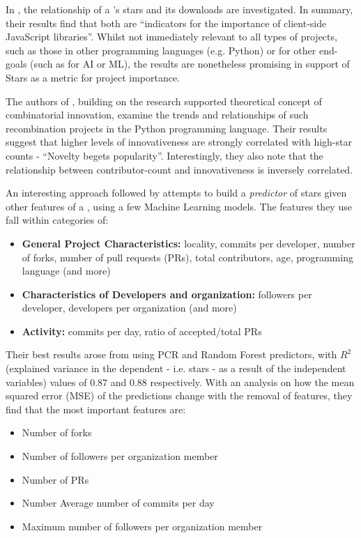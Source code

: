 In \cite{koch_2024_FaultOur}, the relationship of a \repo{}'s stars and its downloads are investigated. In summary, their results find that both are ``indicators for the importance of client-side JavaScript libraries''. Whilst not immediately relevant to all types of \gh{} projects, such as those in other programming languages (e.g. Python) or for other end-goals (such as for AI or ML), the results are nonetheless promising in support of Stars as a metric for project importance.

The authors of \cite{fang2024innovation}, building on the research supported theoretical concept of combinatorial innovation, examine the trends and relationships of such recombination projects in the Python programming language.
Their results suggest that higher levels of innovativeness are strongly correlated with high-star counts - ``Novelty begets popularity''. Interestingly, they also note that the relationship between contributor-count and innovativeness is inversely correlated.

An interesting approach followed by \cite{9588891} attempts to build a \emph{predictor} of \repo{} stars given other features of a \repo{}, using a few Machine Learning models.
The features they use fall within categories of:
\begin{itemize}
  \item \textbf{General Project Characteristics:} locality, commits per developer, number of forks, number of pull requests (PRs), total contributors, \repo{} age, programming language (and more)
  \item \textbf{Characteristics of Developers and organization:} followers per developer, developers per organization (and more)
  \item \textbf{Activity:} commits per day, ratio of accepted/total PRs
\end{itemize}

Their best results arose from using PCR and Random Forest predictors, with $R^2$ (explained variance in the dependent - i.e. stars - as a result of the independent variables) values of $0.87$ and $0.88$ respectively.
With an analysis on how the mean squared error (MSE) of the predictions change with the removal of features, they find that the most important features are:
\begin{itemize}
  \item Number of forks
  \item Number of followers per organization member
  \item Number of PRs
  \item Number Average number of commits per day
  \item Maximum number of followers per organization member
\end{itemize}

